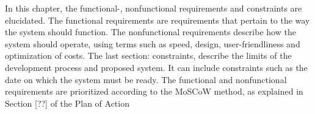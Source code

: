 In this chapter, the functional-, nonfunctional requirements and constraints are elucidated. The functional requirements are requirements that pertain to the way the system should function. The nonfunctional requirements describe how the system should operate, using terms such as speed, design, user-friendliness and optimization of costs. The last section: constraints, describe the limits of the development process and proposed system. It can include constraints such as the date on which the system must be ready. The functional and nonfunctional requirements are prioritized according to the MoSCoW method, as explained in Section [??] of the Plan of Action